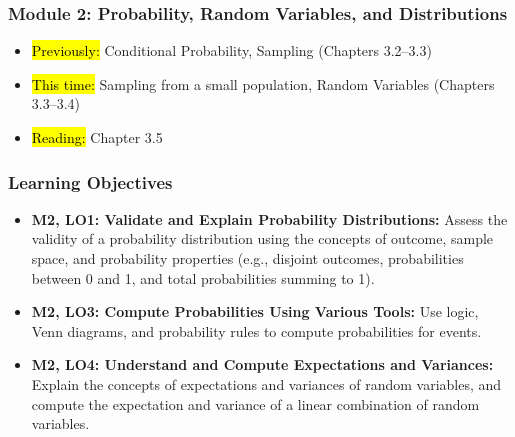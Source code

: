 
\begin{frame}
    \frametitle{Module 2: Probability, Random Variables, and Distributions}
    \begin{itemize}
        \item \hl{Previously: }Conditional Probability, Sampling (Chapters 3.2--3.3)
        \item \hl{This time: }Sampling from a small population, Random Variables (Chapters 3.3--3.4)
        \item \hl{Reading: }Chapter 3.5
    \end{itemize}

\end{frame}
\begin{frame}
    \frametitle{Learning Objectives}
    \begin{itemize}
        \item \textbf{M2, LO1: Validate and Explain Probability Distributions:} Assess the validity of a probability distribution using the concepts of outcome, sample space, and probability properties (e.g., disjoint outcomes, probabilities between 0 and 1, and total probabilities summing to 1).
        \item \textbf{M2, LO3: Compute Probabilities Using Various Tools:} Use logic, Venn diagrams, and probability rules to compute probabilities for events.
        \item \textbf{M2, LO4: Understand and Compute Expectations and Variances:} Explain the concepts of expectations and variances of random variables, and compute the expectation and variance of a linear combination of random variables.
    \end{itemize}
\end{frame}
